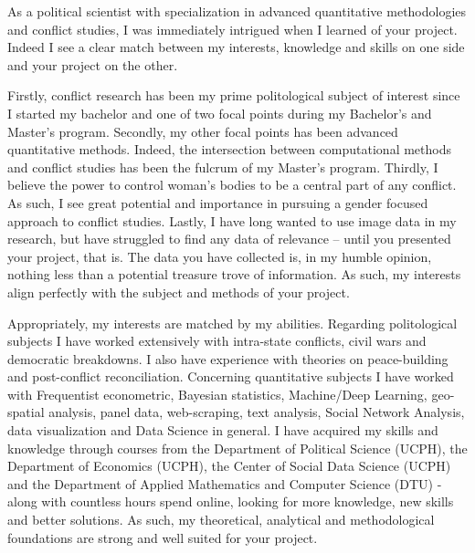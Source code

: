\documentclass[a4paper]{article}
\begin{document}

As a political scientist with specialization in advanced quantitative methodologies and conflict studies, I was immediately intrigued when I learned of your project. Indeed I see a clear match between my interests, knowledge and skills on one side and your project on the other.\par

Firstly, conflict research has been my prime politological subject of interest since I started my bachelor and one of two focal points during my Bachelor's and Master's program. Secondly, my other focal points has been advanced quantitative methods. Indeed, the intersection between computational methods and conflict studies has been the fulcrum of my Master's program. Thirdly, I believe the power to control woman's bodies to be a central part of any conflict. As such, I see great potential and importance in pursuing a gender focused approach to conflict studies. Lastly, I have long wanted to use image data in my research, but have struggled to find any data of relevance -- until you presented your project, that is. The data you have collected is, in my humble opinion, nothing less than a potential treasure trove of information. As such, my interests align perfectly with the subject and methods of your project.\par

Appropriately, my interests are matched by my abilities. Regarding politological subjects I have worked extensively with intra-state conflicts, civil wars and democratic breakdowns. I also have experience with theories on peace-building and post-conflict reconciliation. Concerning quantitative subjects I have worked with Frequentist econometric, Bayesian statistics, Machine/Deep Learning, geo-spatial analysis, panel data, web-scraping, text analysis, Social Network Analysis, data visualization and Data Science in general. I have acquired my skills and knowledge through courses from the Department of Political Science (UCPH), the Department of Economics (UCPH), the Center of Social Data Science (UCPH) and the Department of Applied Mathematics and Computer Science (DTU) - along with countless hours spend online, looking for more knowledge, new skills and better solutions. As such, my theoretical, analytical and methodological foundations are strong and well suited for your project.\par %
\end{document}
